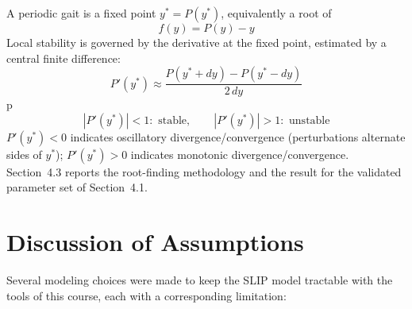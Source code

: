 \documentclass[11pt]{article}
\begin{document}
A periodic gait is a fixed point $y^\ast=P(y^\ast)$, equivalently a
root of
\[
    f(y) = P(y)-y
\]
Local stability is governed by the derivative at the fixed point,
estimated by a central finite difference:
\[
    P'(y^\ast) \approx \frac{P(y^\ast+dy)-P(y^\ast-dy)}{2\,dy}
\]p
\[
    |P'(y^\ast)|<1: \text{ stable}, \qquad |P'(y^\ast)|>1: \text{ unstable}
\]
$P'(y^\ast)<0$ indicates oscillatory divergence/convergence
(perturbations alternate sides of $y^\ast$); $P'(y^\ast)>0$ indicates
monotonic divergence/convergence. Section~4.3 reports the root-finding
methodology and the result for the validated parameter set of
Section~4.1.

\section{Discussion of Assumptions}

Several modeling choices were made to keep the SLIP model tractable
with the tools of this course, each with a corresponding limitation:
\end{document}
